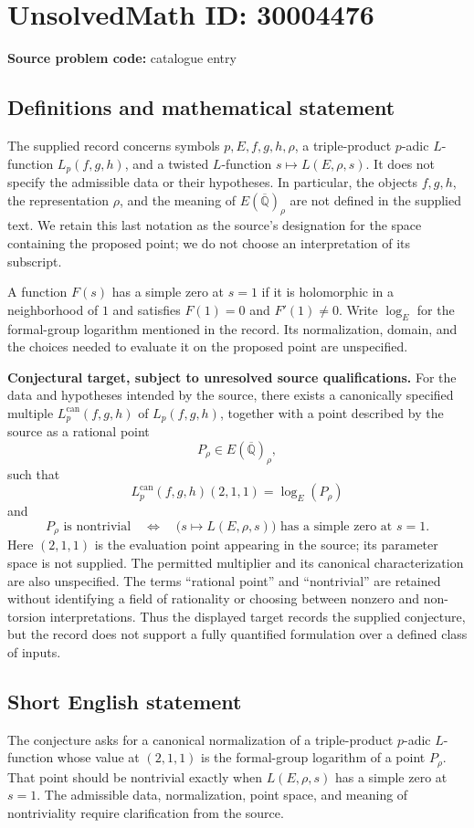 \documentclass[11pt]{article}
\newcommand{\Q}{\mathbb{Q}}
\begin{document}
\section*{UnsolvedMath ID: 30004476}
\textbf{Source problem code:} catalogue entry
\subsection{Definitions and mathematical statement}
The supplied record concerns symbols \(p,E,f,g,h,\rho\), a triple-product \(p\)-adic \(L\)-function \(L_p(f,g,h)\), and a twisted \(L\)-function \(s\mapsto L(E,\rho,s)\). It does not specify the admissible data or their hypotheses. In particular, the objects \(f,g,h\), the representation \(\rho\), and the meaning of \(E(\overline{\Q})_\rho\) are not defined in the supplied text. We retain this last notation as the source's designation for the space containing the proposed point; we do not choose an interpretation of its subscript.

A function \(F(s)\) has a simple zero at \(s=1\) if it is holomorphic in a neighborhood of \(1\) and satisfies \(F(1)=0\) and \(F'(1)\ne 0\). Write \(\log_E\) for the formal-group logarithm mentioned in the record. Its normalization, domain, and the choices needed to evaluate it on the proposed point are unspecified.

\textbf{Conjectural target, subject to unresolved source qualifications.} For the data and hypotheses intended by the source, there exists a canonically specified multiple \(L_p^{\mathrm{can}}(f,g,h)\) of \(L_p(f,g,h)\), together with a point described by the source as a rational point
\[
P_\rho\in E(\overline{\Q})_\rho,
\]
such that
\[
L_p^{\mathrm{can}}(f,g,h)(2,1,1)=\log_E(P_\rho)
\]
and
\[
P_\rho\text{ is nontrivial}
\quad\Longleftrightarrow\quad
\bigl(s\mapsto L(E,\rho,s)\bigr)\text{ has a simple zero at }s=1.
\]
Here \((2,1,1)\) is the evaluation point appearing in the source; its parameter space is not supplied. The permitted multiplier and its canonical characterization are also unspecified. The terms ``rational point'' and ``nontrivial'' are retained without identifying a field of rationality or choosing between nonzero and non-torsion interpretations. Thus the displayed target records the supplied conjecture, but the record does not support a fully quantified formulation over a defined class of inputs.
\subsection{Short English statement}
The conjecture asks for a canonical normalization of a triple-product \(p\)-adic \(L\)-function whose value at \((2,1,1)\) is the formal-group logarithm of a point \(P_\rho\). That point should be nontrivial exactly when \(L(E,\rho,s)\) has a simple zero at \(s=1\). The admissible data, normalization, point space, and meaning of nontriviality require clarification from the source.
\end{document}
